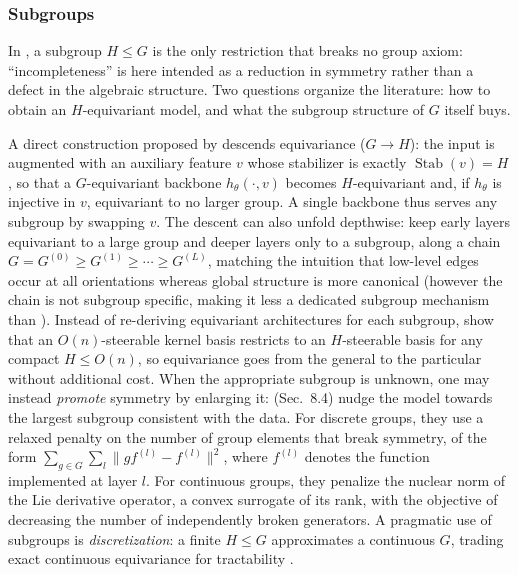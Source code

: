 \documentclass[mathematics,review,submit,moreauthors]{Definitions/mdpi}
\begin{document}
\subsubsection{Subgroups}\label{sec:subgroups}
In , a subgroup $H\le G$ is the only restriction that breaks no group axiom: ``incompleteness'' is here intended as a reduction in symmetry rather than a defect in the algebraic structure.
Two questions organize the literature: how to obtain an $H$-equivariant model, and what the subgroup structure of $G$ itself buys.

A direct construction proposed by \citet{goel2025} descends equivariance ($G\to H$): the input is augmented with an auxiliary feature $v$ whose stabilizer is exactly $\operatorname{Stab}(v)=H$, so that a $G$-equivariant backbone $h_\theta(\cdot,v)$ becomes $H$-equivariant and, if $h_\theta$ is injective in $v$, equivariant to no larger group.
A single backbone thus serves any subgroup by swapping $v$.
The descent can also unfold depthwise: \citet{weiler2019anips} keep early layers equivariant to a large group and deeper layers only to a subgroup, along a chain $G=G^{(0)}\ge G^{(1)}\ge\cdots\ge G^{(L)}$, matching the intuition that low-level edges occur at all orientations whereas global structure is more canonical (however the chain is not subgroup specific, making it less a dedicated subgroup mechanism than \citep{goel2025}).
Instead of re-deriving equivariant architectures for each subgroup, \citet{cesa2021} show that an $O(n)$-steerable kernel basis restricts to an $H$-steerable basis for any compact $H\le O(n)$, so equivariance goes from the general to the particular without additional cost.
When the appropriate subgroup is unknown, one may instead \emph{promote} symmetry by enlarging it: \citet{otto2025} (Sec.~8.4) nudge the model towards the largest subgroup consistent with the data.
For discrete groups, they use a relaxed penalty on the number of group elements that break symmetry, of the form $\sum_{g\in G} \sum_l \| g f^{(l)} - f^{(l)}\|^2$, where $f^{(l)}$ denotes the function implemented at layer $l$.
For continuous groups, they penalize the nuclear norm of the Lie derivative operator, a convex surrogate of its rank, with the objective of decreasing the number of independently broken generators.
A pragmatic use of subgroups is \emph{discretization}: a finite $H\le G$ approximates a continuous $G$, trading exact continuous equivariance for tractability \citep{cohen2016,worrall2018cv-e21ecmgs82ppv,ali2026}.
\end{document}
